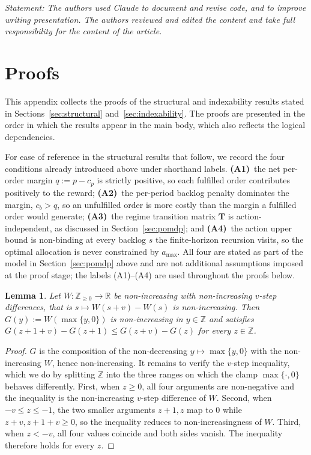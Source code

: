 \documentclass[preprint,11pt,authoryear]{elsarticle}
\newcommand{\bvec}[1]{\mathbf{#1}}
\newtheorem{lemma}{Lemma}
\theoremstyle{remark}
\begin{document}
\textit{Statement: The authors used Claude to document and revise code, and to improve writing presentation. The authors reviewed and edited the content and take full responsibility for the content of the article.}

{\setlength{\bibsep}{1pt plus 0.4pt}\renewcommand{\bibfont}{}

}

\newpage
\appendix

\section{Proofs}
\label{app:proofs}

This appendix collects the proofs of the structural and indexability results stated in Sections~\ref{sec:structural} and~\ref{sec:indexability}. The proofs are presented in the order in which the results appear in the main body, which also reflects the logical dependencies.

For ease of reference in the structural results that follow, we record the four conditions already introduced above under shorthand labels. \textbf{(A1)}~the net per-order margin $q := p - c_p$ is strictly positive, so each fulfilled order contributes positively to the reward; \textbf{(A2)}~the per-period backlog penalty dominates the margin, $c_b > q$, so an unfulfilled order is more costly than the margin a fulfilled order would generate; \textbf{(A3)}~the regime transition matrix $\bvec{T}$ is action-independent, as discussed in Section~\ref{sec:pomdp}; and \textbf{(A4)}~the action upper bound is non-binding at every backlog $s$ the finite-horizon recursion visits, so the optimal allocation is never constrained by $a_{\max}$. All four are stated as part of the model in Section~\ref{sec:pomdp} above and are not additional assumptions imposed at the proof stage; the labels (A1)--(A4) are used throughout the proofs below.

\begin{lemma}
\label{lem:continuation_vconcave}
Let $W : \mathbb{Z}_{\ge 0} \to \mathbb{R}$ be non-increasing with non-increasing $v$-step differences, that is $s \mapsto W(s+v) - W(s)$ is non-increasing. Then $G(y) := W(\max\{y,0\})$ is non-increasing in $y \in \mathbb{Z}$ and satisfies $G(z+1+v) - G(z+1) \le G(z+v) - G(z)$ for every $z \in \mathbb{Z}$.
\end{lemma}
\begin{proof}
$G$ is the composition of the non-decreasing $y \mapsto \max\{y,0\}$ with the non-increasing $W$, hence non-increasing. It remains to verify the $v$-step inequality, which we do by splitting $\mathbb{Z}$ into the three ranges on which the clamp $\max\{\cdot,0\}$ behaves differently. First, when $z \ge 0$, all four arguments are non-negative and the inequality is the non-increasing $v$-step difference of $W$. Second, when $-v \le z \le -1$, the two smaller arguments $z+1,z$ map to $0$ while $z+v,z+1+v \ge 0$, so the inequality reduces to non-increasingness of $W$. Third, when $z < -v$, all four values coincide and both sides vanish. The inequality therefore holds for every $z$.
\end{proof}
\end{document}
